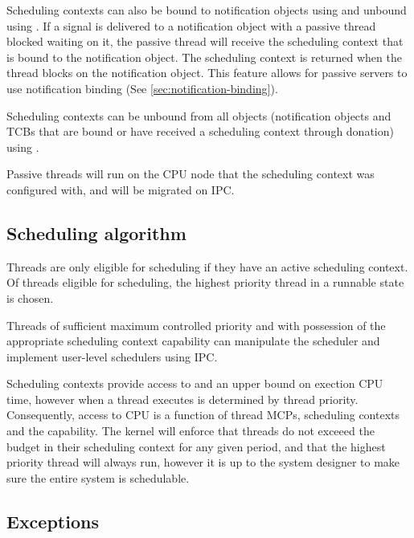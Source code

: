 Scheduling contexts can also be bound to notification objects using
 and unbound using
.  If a signal is delivered to
a notification object with a passive thread blocked waiting on it, the passive thread will receive
the scheduling context that is bound to the notification object.  The scheduling context is returned
when the thread blocks on the notification object.  This feature allows for passive servers to use
notification binding (See \autoref{sec:notification-binding}).

Scheduling contexts can be unbound from all objects (notification objects and TCBs that are bound or
have received a scheduling context through donation) using
.

Passive threads will run on the CPU node that the scheduling context was configured with, and will
be migrated on IPC.

\subsection{Scheduling algorithm} \label{sec:mcs-sched}

Threads are only eligible for scheduling if they have an active scheduling context.
Of threads eligible for scheduling, the highest priority thread in a runnable state is chosen.

Threads of sufficient maximum controlled priority and with possession of the
appropriate scheduling context capability can manipulate the scheduler and
implement user-level schedulers using IPC.

Scheduling contexts provide access to and an upper bound on exection CPU time,
however when a thread executes is determined by thread priority.  Consequently,
access to CPU is a function of thread MCPs, scheduling contexts and the
 capability.  The kernel will enforce that threads do not
exceeed the budget in their scheduling context for any given period, and that
the highest priority thread will always run, however it is up to the system
designer to make sure the entire system is schedulable.


\subsection{Exceptions}
\label{sec:exceptions}

